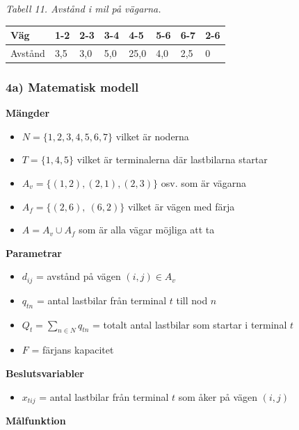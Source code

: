 \documentclass[11pt]{article}
\providecommand{\tightlist}{%
      \setlength{\itemsep}{0pt}\setlength{\parskip}{0pt}}
\begin{document}
\emph{Tabell 11. Avstånd i mil på vägarna.}

{\def\LTcaptype{none} %
\begin{longtable}[]{@{}llllllll@{}}
\toprule\noalign{}
Väg & 1-2 & 2-3 & 3-4 & 4-5 & 5-6 & 6-7 & 2-6 \\
\midrule\noalign{}
\endhead
\bottomrule\noalign{}
\endlastfoot
Avstånd & 3,5 & 3,0 & 5,0 & 25,0 & 4,0 & 2,5 & 0 \\
\end{longtable}
}

\subsubsection{4a) Matematisk modell}\label{a-matematisk-modell}

\textbf{Mängder}

\begin{itemize}
\tightlist
\item
  \(N = \{1, 2, 3, 4, 5, 6, 7\}\) vilket är noderna
\item
  \(T = \{1, 4, 5\}\) vilket är terminalerna där lastbilarna startar
\item
  \(A_v = \{(1,2), (2,1), (2,3)\}\) osv. som är vägarna
\item
  \(A_f = \{(2,6),\ (6,2)\}\) vilket är vägen med färja
\item
  \(A = A_v \cup A_f\) som är alla vägar möjliga att ta
\end{itemize}

\textbf{Parametrar}

\begin{itemize}
\tightlist
\item
  \(d_{ij}\) = avstånd på vägen \((i,j) \in A_v\)
\item
  \(q_{tn}\) = antal lastbilar från terminal \(t\) till nod \(n\)
\item
  \(Q_t = \sum_{n \in N} q_{tn}\) = totalt antal lastbilar som startar i
  terminal \(t\)
\item
  \(F\) = färjans kapacitet
\end{itemize}

\textbf{Beslutsvariabler}

\begin{itemize}
\tightlist
\item
  \(x_{tij}\) = antal lastbilar från terminal \(t\) som åker på vägen
  \((i,j)\)
\end{itemize}

\textbf{Målfunktion}
\end{document}
